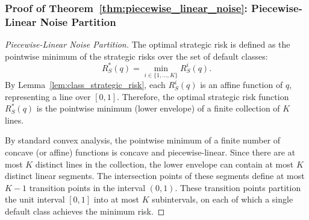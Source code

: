 \subsubsection*{Proof of Theorem~\ref{thm:piecewise_linear_noise}: Piecewise-Linear Noise Partition}
\label{app:proof_piecewise_linear_noise}
\begin{proof}[Piecewise-Linear Noise Partition]
The optimal strategic risk is defined as the pointwise minimum of the strategic risks over the set of default classes:
\begin{equation}
    R^*_S(q) = \min_{i \in \{1, \dots, K\}} R^i_S(q).
\end{equation}
By Lemma~\ref{lem:class_strategic_risk}, each $R^i_S(q)$ is an affine function of $q$, representing a line over $[0, 1]$. Therefore, the optimal strategic risk function $R^*_S(q)$ is the pointwise minimum (lower envelope) of a finite collection of $K$ lines.

By standard convex analysis, the pointwise minimum of a finite number of concave (or affine) functions is concave and piecewise-linear. 
Since there are at most $K$ distinct lines in the collection, the lower envelope can contain at most $K$ distinct linear segments. The intersection points of these segments define at most $K - 1$ transition points in the interval $(0, 1)$. These transition points partition the unit interval $[0, 1]$ into at most $K$ subintervals, on each of which a single default class achieves the minimum risk.
\end{proof}

